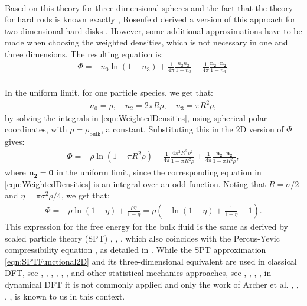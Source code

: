 \documentclass[11pt, a4paper]{article}
\theoremstyle{definition}
\begin{document}
\\
Based on this theory for three dimensional spheres and the fact that the theory for hard rods is known exactly \cite{Percus1976}, Rosenfeld derived a version of this approach for two dimensional hard disks \cite{Rosenfeld2DInterp}. However, some additional approximations have to be made when choosing the weighted densities, which is not necessary in one and three dimensions. The resulting equation is:
\begin{align*}
	\Phi = - n_0 \ln(1-n_3) + \frac{1}{4 \pi} \frac{n_2 n_2}{1-n_3} + \frac{1}{4 \pi} \frac{\mathbf{n_2} \cdot \mathbf{n_2}}{1-n_3}.
\end{align*}
\\
In the uniform limit, for one particle species, we get that:
\begin{align*}
	n_0 = \rho, \quad n_2 = 2 \pi R \rho, \quad n_3 = \pi R^2 \rho,
\end{align*}
by solving the integrals in \eqref{eqn:WeightedDensities}, using spherical polar coordinates, with $\rho = \rho_{\text{bulk}}$, a constant. 
Substituting this in the 2D version of $\Phi$ gives:
\begin{align*}
	\Phi = - \rho \ln (1- \pi R^2 \rho) + \frac{1}{4 \pi} \frac{4\pi^2 R^2 \rho^2}{1 - \pi R^2 \rho} + \frac{1}{4 \pi}\frac{\mathbf{n_2} \cdot \mathbf{n_2}}{1 - \pi R^2 \rho},
\end{align*}
where $\mathbf{n_2} = \mathbf 0$ in the uniform limit, since the corresponding equation in \eqref{eqn:WeightedDensities} is an integral over an odd function.
Noting that $R = \sigma/2$ and $\eta = \pi \sigma^2 \rho /4$, we get that:
\begin{align} \label{eqn:SPTFunctional2D}
	\Phi = - \rho \ln (1- \eta) + \frac{\rho \eta}{1 - \eta} = \rho \left(-\ln(1-\eta) + \frac{1}{1- \eta} -1 \right).
\end{align} 
This expression for the free energy for the bulk fluid is the same as derived by scaled particle theory (SPT) \cite{Reiss1959}, \cite{Reiss1960}, \cite{Helfand1961}, which also coincides with the Percus-Yevic compressibility equation \cite{PercusYevick1}, as detailed in \cite{RosenfeldSPT}.
While the SPT approximation \eqref{eqn:SPTFunctional2D} and its three-dimensional equivalent are used in classical DFT, see \cite{DFTWinkelmann2001}, \cite{DFTRoth1}, \cite{DFTRoth2}, \cite{DFTGonzalez1997}, \cite{DFTCuesta2008}, \cite{DFTLoewen2002}, and other statistical mechanics approaches, see \cite{GrafLoewen1999}, \cite{DuBois2002}, \cite{Chamoux1998}, \cite{Chamoux1996}, in dynamical DFT it is not commonly applied and only the work of Archer et al. \cite{ArcherSed1}, \cite{ArcherSed2008}, \cite{ArcherSed2011}, \cite{ArcherSed2013}, is known to us in this context.
\end{document}
